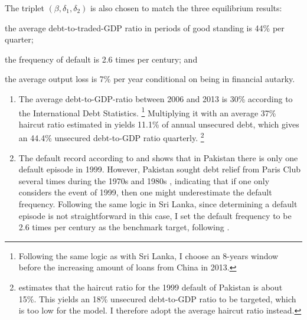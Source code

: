 The triplet $\left( \beta, \delta_1, \delta_2 \right)$ is also chosen to match the three equilibrium results:
\begin{enumerate*}[label = (\roman*)]
    \item the average debt-to-traded-GDP ratio in periods of good standing is 44\% per quarter;
    \item the frequency of default is 2.6 times per century; and
    \item the average output loss is 7\% per year conditional on being in financial autarky.
\end{enumerate*}
\begin{enumerate}[label = (\roman*)]
    \item
    The average debt-to-GDP-ratio between 2006 and 2013 is 30\% according to the International Debt Statistics.%
    \footnote{
        Following the same logic as with Sri Lanka, I choose an 8-years window before the increasing amount of loans from China in 2013.
        }
    Multiplying it with an average 37\% haircut ratio estimated in \citet{Cruces-Trebesch-13} yields 11.1\% of annual unsecured debt, which gives an 44.4\% unsecured debt-to-GDP ratio quarterly.%
    \footnote{
        \citet{Cruces-Trebesch-13} estimates that the haircut ratio for the 1999 default of Pakistan is about 15\%. This yields an 18\% unsecured debt-to-GDP ratio to be targeted, which is too low for the model. I therefore adopt the average haircut ratio instead.
        }
    \item The default record according to \citet{SPGlobal-default-report} and \citet{Uribe-Schmitt-Grohe-textbook} shows that in Pakistan there is only one default episode in 1999. However, Pakistan sought debt relief from Paris Club several times during the 1970s and 1980s \citep{pakistan-default-start}, indicating that if one only considers the event of 1999, then one might underestimate the default frequency.\footnotemark{} Following the same logic in Sri Lanka, since determining a default episode is not straightforward in this case, I set the default frequency to be 2.6 times per century as the benchmark target, following \citet{Na-18}.
\end{enumerate}
